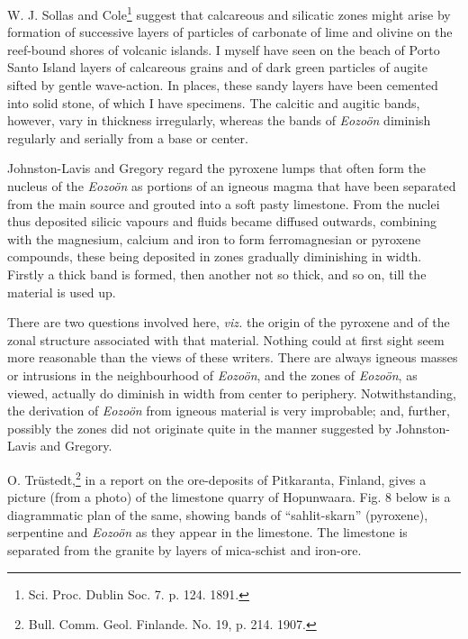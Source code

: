 \documentclass[a4paper, 12pt, oneside]{article}
\begin{document}
W. J. Sollas and Cole\footnote{Sci. Proc. Dublin Soc. 7. p. 124. 1891.} suggest that calcareous and silicatic zones might arise by formation of successive layers of particles of carbonate of lime and olivine on the reef-bound shores of volcanic islands. I myself have seen on the beach of Porto Santo Island layers of calcareous grains and of dark green particles of augite sifted by gentle wave-action. In places, these sandy layers have been cemented into solid stone, of which I have specimens. The calcitic and augitic bands, however, vary in thickness irregularly, whereas the bands of \emph{Eozoön} diminish regularly and serially from a base or center.

Johnston-Lavis and Gregory regard the pyroxene lumps that often form the nucleus of the \emph{Eozoön} as portions of an igneous magma that have been separated from the main source and grouted into a soft pasty limestone. From the nuclei thus deposited silicic vapours and fluids became diffused outwards, combining with the magnesium, calcium and iron to form ferromagnesian or pyroxene compounds, these being deposited in zones gradually diminishing in width. Firstly a thick band is formed, then another not so thick, and so on, till the material is used up.

There are two questions involved here, \emph{viz.} the origin of the pyroxene and of the zonal structure associated with that material. Nothing could at first sight seem more reasonable than the views of these writers. There are always igneous masses or intrusions in the neighbourhood of \emph{Eozoön}, and the zones of \emph{Eozoön}, as viewed, actually do diminish in width from center to periphery. Notwithstanding, the derivation of \emph{Eozoön} from igneous material is very improbable; and, further, possibly the zones did not originate quite in the manner suggested by Johnston-Lavis and Gregory.

O. Trüstedt,\footnote{Bull. Comm. Geol. Finlande. No. 19, p. 214. 1907.} in a report on the ore-deposits of Pitkaranta, Finland, gives a picture (from a photo) of the limestone quarry of Hopunwaara. Fig. 8 below is a diagrammatic plan of the same, showing bands of ``sahlit-skarn'' (pyroxene), serpentine and \emph{Eozoön} as they appear in the limestone. The limestone is separated from the granite by layers of mica-schist and iron-ore. 
\end{document}
